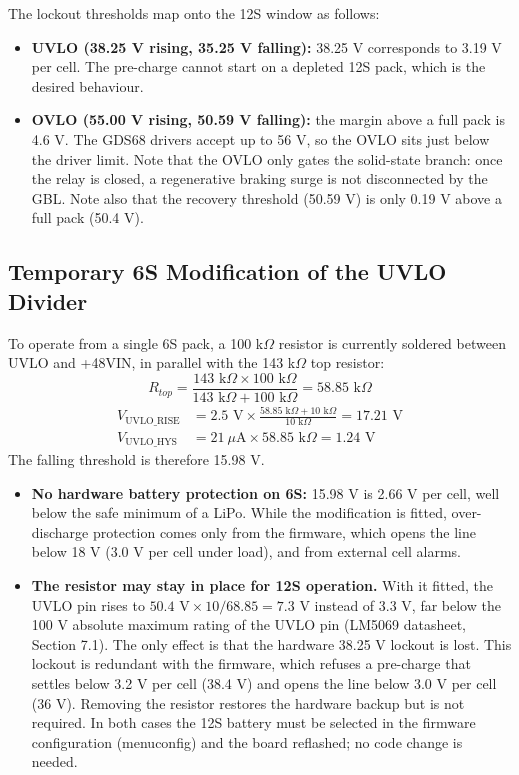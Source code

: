 \documentclass[11pt,a4paper]{article}
\begin{document}
The lockout thresholds map onto the 12S window as follows:
\begin{itemize}
    \item \textbf{UVLO (38.25 V rising, 35.25 V falling):} 38.25 V corresponds to 3.19 V per cell. The pre-charge cannot start on a depleted 12S pack, which is the desired behaviour.
    \item \textbf{OVLO (55.00 V rising, 50.59 V falling):} the margin above a full pack is 4.6 V. The GDS68 drivers accept up to 56 V, so the OVLO sits just below the driver limit. Note that the OVLO only gates the solid-state branch: once the relay is closed, a regenerative braking surge is not disconnected by the GBL. Note also that the recovery threshold (50.59 V) is only 0.19 V above a full pack (50.4 V).
\end{itemize}

\subsection{Temporary 6S Modification of the UVLO Divider}
\label{sec:review_uvlo}

To operate from a single 6S pack, a 100 k$\Omega$ resistor is currently soldered between UVLO and +48VIN, in parallel with the 143 k$\Omega$ top resistor:
\begin{equation}
R_{top} = \frac{143 \text{ k}\Omega \times 100 \text{ k}\Omega}{143 \text{ k}\Omega + 100 \text{ k}\Omega} = 58.85 \text{ k}\Omega
\end{equation}
\begin{align}
V_{\text{UVLO\_RISE}} &= 2.5 \text{ V} \times \frac{58.85 \text{ k}\Omega + 10 \text{ k}\Omega}{10 \text{ k}\Omega} = 17.21 \text{ V} \\
V_{\text{UVLO\_HYS}} &= 21\ \mu\text{A} \times 58.85 \text{ k}\Omega = 1.24 \text{ V}
\end{align}
The falling threshold is therefore 15.98 V.

\begin{itemize}
    \item \textbf{No hardware battery protection on 6S:} 15.98 V is 2.66 V per cell, well below the safe minimum of a LiPo. While the modification is fitted, over-discharge protection comes only from the firmware, which opens the line below 18 V (3.0 V per cell under load), and from external cell alarms.
    \item \textbf{The resistor may stay in place for 12S operation.} With it fitted, the UVLO pin rises to $50.4 \text{ V} \times 10 / 68.85 = 7.3$ V instead of 3.3 V, far below the 100 V absolute maximum rating of the UVLO pin (LM5069 datasheet, Section 7.1). The only effect is that the hardware 38.25 V lockout is lost. This lockout is redundant with the firmware, which refuses a pre-charge that settles below 3.2 V per cell (38.4 V) and opens the line below 3.0 V per cell (36 V). Removing the resistor restores the hardware backup but is not required. In both cases the 12S battery must be selected in the firmware configuration (menuconfig) and the board reflashed; no code change is needed.
\end{itemize}
\end{document}
